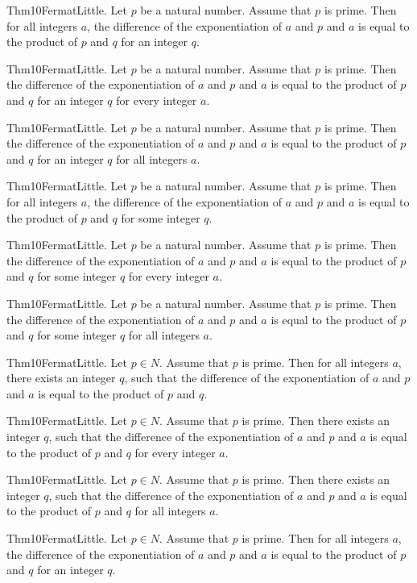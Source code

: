 \documentclass{article}
\begin{document}
Thm10FermatLittle. Let $p$ be a natural number. Assume that $p$ is prime. Then for all integers $a$, the difference of the exponentiation of $a$ and $p$ and $a$ is equal to the product of $p$ and $q$ for an integer $q$.

Thm10FermatLittle. Let $p$ be a natural number. Assume that $p$ is prime. Then the difference of the exponentiation of $a$ and $p$ and $a$ is equal to the product of $p$ and $q$ for an integer $q$ for every integer $a$.

Thm10FermatLittle. Let $p$ be a natural number. Assume that $p$ is prime. Then the difference of the exponentiation of $a$ and $p$ and $a$ is equal to the product of $p$ and $q$ for an integer $q$ for all integers $a$.

Thm10FermatLittle. Let $p$ be a natural number. Assume that $p$ is prime. Then for all integers $a$, the difference of the exponentiation of $a$ and $p$ and $a$ is equal to the product of $p$ and $q$ for some integer $q$.

Thm10FermatLittle. Let $p$ be a natural number. Assume that $p$ is prime. Then the difference of the exponentiation of $a$ and $p$ and $a$ is equal to the product of $p$ and $q$ for some integer $q$ for every integer $a$.

Thm10FermatLittle. Let $p$ be a natural number. Assume that $p$ is prime. Then the difference of the exponentiation of $a$ and $p$ and $a$ is equal to the product of $p$ and $q$ for some integer $q$ for all integers $a$.

Thm10FermatLittle. Let $p \in N$. Assume that $p$ is prime. Then for all integers $a$, there exists an integer $q$, such that the difference of the exponentiation of $a$ and $p$ and $a$ is equal to the product of $p$ and $q$.

Thm10FermatLittle. Let $p \in N$. Assume that $p$ is prime. Then there exists an integer $q$, such that the difference of the exponentiation of $a$ and $p$ and $a$ is equal to the product of $p$ and $q$ for every integer $a$.

Thm10FermatLittle. Let $p \in N$. Assume that $p$ is prime. Then there exists an integer $q$, such that the difference of the exponentiation of $a$ and $p$ and $a$ is equal to the product of $p$ and $q$ for all integers $a$.

Thm10FermatLittle. Let $p \in N$. Assume that $p$ is prime. Then for all integers $a$, the difference of the exponentiation of $a$ and $p$ and $a$ is equal to the product of $p$ and $q$ for an integer $q$.
\end{document}
